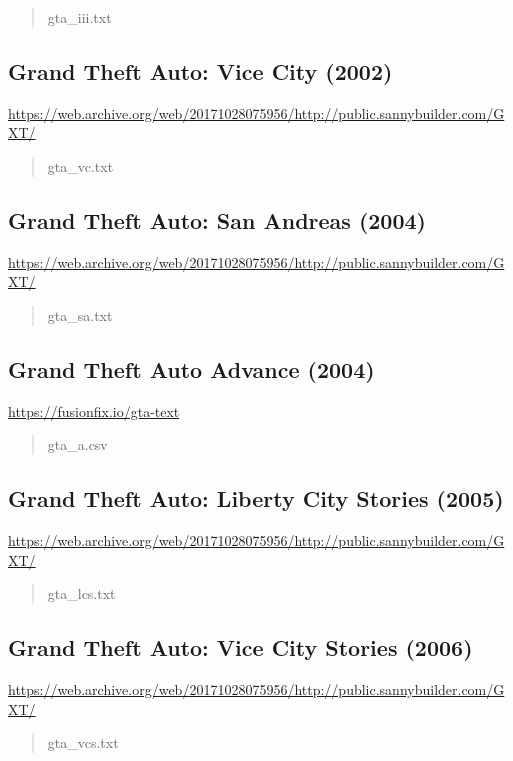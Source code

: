 \documentclass[]{scrartcl}
\begin{document}
\begin{quote}
   \ttfamily
   gta\_iii.txt
\end{quote}


\subsection*{Grand Theft Auto: Vice City (2002)}
\url{https://web.archive.org/web/20171028075956/http://public.sannybuilder.com/GXT/}

\begin{quote}
   \ttfamily
   gta\_vc.txt
\end{quote}


\subsection*{Grand Theft Auto: San Andreas (2004)}
\url{https://web.archive.org/web/20171028075956/http://public.sannybuilder.com/GXT/}

\begin{quote}
   \ttfamily
   gta\_sa.txt
\end{quote}


\subsection*{Grand Theft Auto Advance (2004)}
\url{https://fusionfix.io/gta-text}

\begin{quote}
   \ttfamily
   gta\_a.csv
\end{quote}


\subsection*{Grand Theft Auto: Liberty City Stories (2005)}
\url{https://web.archive.org/web/20171028075956/http://public.sannybuilder.com/GXT/}

\begin{quote}
   \ttfamily
   gta\_lcs.txt
\end{quote}


\subsection*{Grand Theft Auto: Vice City Stories (2006)}
\url{https://web.archive.org/web/20171028075956/http://public.sannybuilder.com/GXT/}

\begin{quote}
   \ttfamily
   gta\_vcs.txt
\end{quote}
\end{document}
